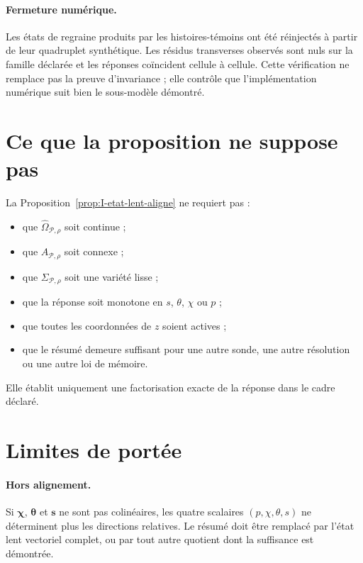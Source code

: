 \paragraph{Fermeture numérique.}
Les états de regraine produits par les histoires-témoins ont été
réinjectés à partir de leur quadruplet synthétique. Les résidus
transverses observés sont nuls sur la famille déclarée et les réponses
coïncident cellule à cellule. Cette vérification ne remplace pas la
preuve d'invariance ; elle contrôle que l'implémentation numérique suit
bien le sous-modèle démontré.

\section{Ce que la proposition ne suppose pas}
\label{annexe-I-non-hypotheses}

La Proposition~\ref{prop:I-etat-lent-aligne} ne requiert pas :
\begin{itemize}
\item que $\widehat\Omega_{\mathcal P,\rho}$ soit continue ;
\item que $A_{\mathcal P,\rho}$ soit connexe ;
\item que $\Sigma_{\mathcal P,\rho}$ soit une variété lisse ;
\item que la réponse soit monotone en $s$, $\theta$, $\chi$ ou $p$ ;
\item que toutes les coordonnées de $z$ soient actives ;
\item que le résumé demeure suffisant pour une autre sonde, une autre
  résolution ou une autre loi de mémoire.
\end{itemize}

Elle établit uniquement une factorisation exacte de la réponse dans le
cadre déclaré.

\section{Limites de portée}
\label{annexe-I-limites}

\paragraph{Hors alignement.}
Si $\boldsymbol\chi$, $\boldsymbol\theta$ et $\mathbf s$ ne sont pas
colinéaires, les quatre scalaires $(p,\chi,\theta,s)$ ne déterminent plus
les directions relatives. Le résumé doit être remplacé par l'état lent
vectoriel complet, ou par tout autre quotient dont la suffisance est
démontrée.

